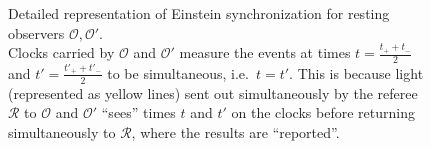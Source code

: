 \begin{figure}
\caption{Detailed representation of Einstein synchronization for resting observers $\mathcal{O}, \mathcal{O}'$.\\
Clocks carried by $\mathcal{O}$ and $\mathcal{O}'$ measure the events at times $t = \frac{t_+ + t_-}{2}$ and $t' = \frac{t'_+ + t'_-}{2}$ to be simultaneous, i.e.~$t = t'$. This is because light (represented as yellow lines) sent out simultaneously by the referee $\mathcal{R}$ to $\mathcal{O}$ and $\mathcal{O}'$ \enquote{sees} times $t$ and $t'$ on the clocks before returning simultaneously to $\mathcal{R}$, where the results are \enquote{reported}.}
\label{fig:resting_clocks}
\end{figure}



